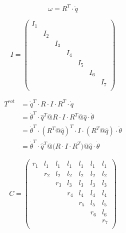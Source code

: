 {\begin{equation*}
    \omega = R^T \cdot \dot{q}
\end{equation*}


\begin{equation*}
    I =
    \begin{pmatrix}
        I_1 &     &     &     &     &     &     \\
            & I_2 &     &     &     &     &     \\
            &     & I_3 &     &     &     &     \\
            &     &     & I_4 &     &     &     \\
            &     &     &     & I_5 &     &     \\
            &     &     &     &     & I_6 &     \\
            &     &     &     &     &     & I_7 \\
    \end{pmatrix}
\end{equation*}

\begin{align*}
    T^{rot} &= \dot{q}^T \cdot R \cdot I \cdot R^T \cdot \dot{q} \\
            &= \dot{\theta}^T \cdot \hat{q}^T @ R \cdot I \cdot R^T @ \hat{q} \cdot \dot{\theta} \\
            &= \dot{\theta}^T \cdot (R^T @ \hat{q})^T \cdot I \cdot (R^T @ \hat{q}) \cdot \dot{\theta} \\
            &= \dot{\theta}^T \cdot \hat{q}^T @ \Big( R \cdot I \cdot R^T \Big) @ \hat{q} \cdot \dot{\theta}
\end{align*}


\begin{equation*}
    C =
    \begin{pmatrix}
        r_1 & l_1 & l_1 & l_1 & l_1 & l_1 & l_1 \\
            & r_2 & l_2 & l_2 & l_2 & l_2 & l_2 \\
            &     & r_3 & l_3 & l_3 & l_3 & l_3 \\
            &     &     & r_4 & l_4 & l_4 & l_4 \\
            &     &     &     & r_5 & l_5 & l_5 \\
            &     &     &     &     & r_6 & l_6 \\
            &     &     &     &     &     & r_7 \\
    \end{pmatrix}
\end{equation*}

}
